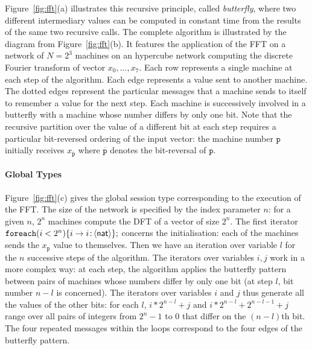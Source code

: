 \documentclass{LMCS}
\newcommand{\ptilde}[1]{{\ensuremath{#1}}}
\newcommand{\kf}[1]{\textup{\textsf{#1}}\xspace}
\newcommand{\pp}{\ensuremath{\at{\p}}}
\newcommand{\participant}[1]{\ensuremath{\mathtt{#1}}}
\newcommand{\p}{\ensuremath{\participant{p}}}
\newcommand{\at}[1]{\ensuremath{\ptilde{#1}}}
\newcommand{\Nat}{\kf{nat}}
\newcommand{\ENCan}[1]{\langle #1 \rangle}
\newcommand{\TO}[2]{#1\to #2}
\newcommand{\GS}[3]{\TO{#1}{#2}\colon \!\ENCan{#3}}
\newcommand{\ii}{\ensuremath{i}}
\newcommand{\FOREACH}[3]{\ensuremath{\mathtt{foreach}(#1 #2)\{#3\}}}
\begin{document}
Figure~\ref{fig:fft}(a) illustrates this
recursive principle, called {\em butterfly}, where two
different intermediary values can be computed in constant time from the results
of the same two recursive calls. 
The complete algorithm is illustrated by the diagram from
Figure~\ref{fig:fft}(b).  It features the application of the FFT on a network of
$N=2^3$ machines on an hypercube network computing the discrete Fourier
transform of vector $x_0, \ldots, x_7$.  Each row represents a single machine at
each step of the algorithm. Each edge represents a value sent to another
machine. The dotted edges represent the particular messages that a machine sends
to itself to remember a value for the next step.  Each machine is successively
involved in a butterfly with a machine whose number differs by only one
bit. Note that the recursive partition over the value of a different bit at each
step requires a particular bit-reversed ordering of the input vector: the
machine number $\pp$ initially receives $x_{\overline{\pp}}$ where
$\overline{\pp}$ denotes the bit-reversal of $\pp$.





\paragraph{\bf Global Types}
Figure~\ref{fig:fft}(c) gives the global session type corresponding to the
execution of the FFT.  The size of the network is specified by the index
parameter $n$: for a given $n$, $2^n$ machines compute the DFT of a vector of
size $2^n$. The first iterator
$\FOREACH{\ii}{<2^n}{\GS{i}{i}{\Nat}};$
concerns the initialisation:
each of the machines sends the $x_\pp$ value to themselves. Then we have an
iteration over variable $l$ for the $n$ successive steps of the algorithm. The
iterators over variables $i,j$ work in a more complex way: at each step, the
algorithm applies the butterfly pattern between pairs of machines whose numbers
differ by only one bit (at step $l$, bit number $n-l$ is concerned). The iterators
over variables $i$ and $j$ thus generate all the values of the other bits: for
each $l$, $i*2^{n-l}+j$ and $i*2^{n-l}+2^{n-l-1}+j$ range over all pairs of
integers from $2^n-1$ to $0$ that differ on the $(n-l)$th bit. The four repeated
messages within the loops correspond to the four edges of the
butterfly pattern.
\end{document}

